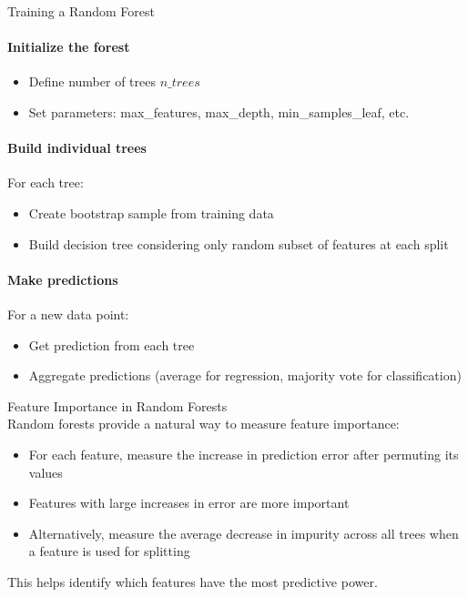 \begin{KR}{Training a Random Forest}\\
\paragraph{Initialize the forest}
\begin{itemize}
    \item Define number of trees $n\_trees$
    \item Set parameters: max\_features, max\_depth, min\_samples\_leaf, etc.
\end{itemize}

\paragraph{Build individual trees}
For each tree:
\begin{itemize}
    \item Create bootstrap sample from training data
    \item Build decision tree considering only random subset of features at each split
\end{itemize}

\paragraph{Make predictions}
For a new data point:
\begin{itemize}
    \item Get prediction from each tree
    \item Aggregate predictions (average for regression, majority vote for classification)
\end{itemize}
\end{KR}

\begin{concept}{Feature Importance in Random Forests}\\
Random forests provide a natural way to measure feature importance:
\begin{itemize}
    \item For each feature, measure the increase in prediction error after permuting its values
    \item Features with large increases in error are more important
    \item Alternatively, measure the average decrease in impurity across all trees when a feature is used for splitting
\end{itemize}
This helps identify which features have the most predictive power.
\end{concept}

